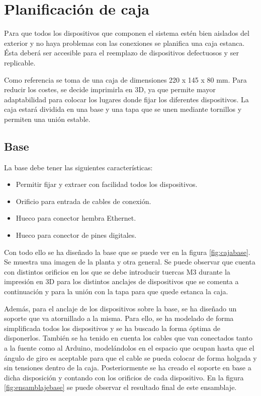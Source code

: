 \chapter{Planificación de caja}\label{chp-04}

\lettrine[lraise=-0.1, lines=2, loversize=0.2]{P}ara que todos los dispositivos que componen el sistema estén bien aislados del exterior
y no haya problemas con las conexiones se planifica una caja estanca. Ésta deberá ser 
accesible para el reemplazo de dispositivos defectuosos y ser replicable. 

Como referencia se toma de una caja de dimensiones 220 x 145 x 80 mm. Para reducir los 
costes, se decide imprimirla en 3D, ya que permite mayor adaptabilidad para colocar 
los lugares donde fijar los diferentes dispositivos. La caja estará dividida en una base y una 
tapa que se unen mediante tornillos y permiten una unión estable.

\section{Base}

La base debe tener las siguientes características:
\begin{itemize}
    \item Permitir fijar y extraer con facilidad todos los dispositivos. 
    \item Orificio para entrada de cables de conexión.
    \item Hueco para conector hembra Ethernet.
    \item Hueco para conector de pines digitales.
\end{itemize} 

Con todo ello se ha diseñado la base que se puede ver en la figura \ref{fig:cajabase}. Se muestra
una imagen de la planta y otra general. Se puede observar que cuenta con distintos orificios en los
que se debe introducir tuercas M3 durante la impresión en 3D para los distintos anclajes de dispositivos
que se comenta a continuación y para la unión con la tapa para que quede estanca la caja.

Además, para el anclaje de los dispositivos sobre la base, se ha diseñado un soporte que va atornillado
a la misma. Para ello, se ha modelado de forma simplificada todos los dispositivos y se ha buscado la 
forma óptima de disponerlos. También se ha tenido en cuenta los cables que van conectados tanto a la 
fuente como al Arduino, modelándolos en el espacio que ocupan hasta que el ángulo de giro es aceptable
para que el cable se pueda colocar de forma holgada y sin tensiones dentro de la caja.
Posteriormente se ha creado el soporte en base a dicha disposición y contando con los orificios de cada
dispositivo. En la figura \ref{fig:ensamblajebase} se puede observar el resultado final de este ensamblaje.

